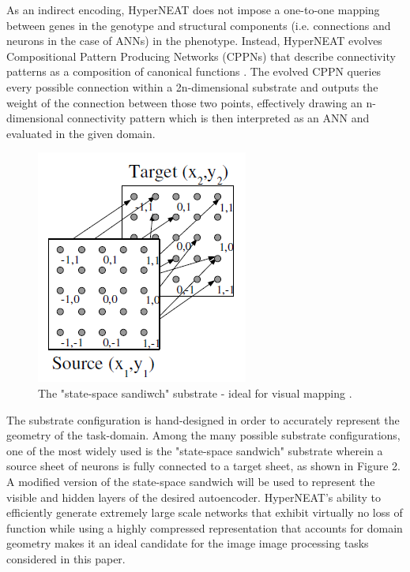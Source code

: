 \documentclass{acm_proc_article-sp}
\begin{document}
As an indirect encoding, HyperNEAT does not impose a one-to-one mapping between genes in the genotype and structural components (i.e. connections and neurons in the case of ANNs) in the phenotype. Instead, HyperNEAT evolves Compositional Pattern Producing Networks (CPPNs) that describe connectivity patterns as a composition of canonical functions \cite{Stanley:2007:CPP:1265496.1265517, Stanley:2009:HEE:1516090.1516093}.  The evolved CPPN queries every possible connection within a 2n-dimensional substrate and outputs the weight of the connection between those two points, effectively drawing an n-dimensional connectivity pattern which is then interpreted as an ANN and evaluated in the given domain.

\begin{figure}[h]
\caption{The "state-space sandiwch" substrate - ideal for visual mapping \cite{Stanley:2009:HEE:1516090.1516093}.}
\centering
\includegraphics[scale=0.8]{StateSpaceSandwichSubstrate}
\end{figure}

The substrate configuration is hand-designed in order to accurately represent the geometry of the task-domain.  Among the many possible substrate configurations, one of the most widely used is the "state-space sandwich" substrate wherein a source sheet of neurons is fully connected to a target sheet, as shown in Figure 2.  A modified version of the state-space sandwich will be used to represent the visible and hidden layers of the desired autoencoder.  HyperNEAT’s ability to efficiently generate extremely large scale networks that exhibit virtually no loss of function while using a highly compressed representation that accounts for domain geometry makes it an ideal candidate for the image image processing tasks considered in this paper.
\end{document}
